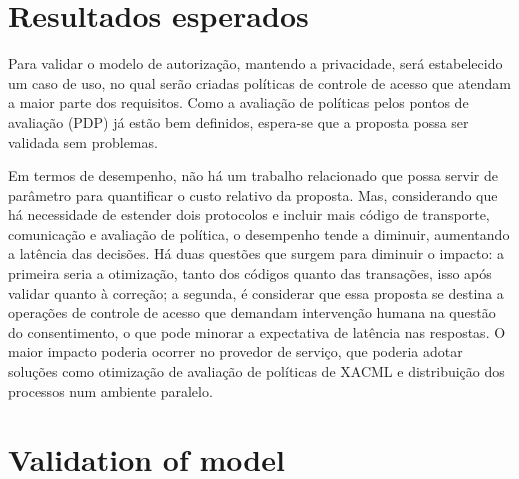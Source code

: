 \documentclass{doublecol-new}
\begin{document}


\section{Resultados esperados}\label{sec:result_esperados}

Para validar o modelo de autorização, mantendo a privacidade, será estabelecido um caso de uso, no qual serão criadas políticas de controle de acesso que atendam a maior parte dos requisitos. Como a avaliação de políticas pelos pontos de avaliação (PDP) já estão bem definidos, espera-se que a proposta possa ser validada sem problemas.

Em termos de desempenho, não há um trabalho relacionado que possa servir de parâmetro para quantificar o custo relativo da proposta. Mas, considerando que há necessidade de estender dois protocolos e incluir mais código de transporte, comunicação e avaliação de política, o desempenho tende a diminuir, aumentando a latência das decisões. Há duas questões que surgem para diminuir o impacto: a primeira seria a otimização, tanto dos códigos quanto das transações, isso após validar quanto à correção; a segunda, é considerar que essa proposta se destina a operações de controle de acesso que demandam intervenção humana na questão do consentimento, o que pode minorar a expectativa de latência nas respostas. O maior impacto poderia ocorrer no provedor de serviço, que poderia adotar soluções como otimização de avaliação de políticas de XACML \cite{mourad2014towards} e distribuição dos processos num ambiente paralelo.



\section{Validation of model}
\end{document}
